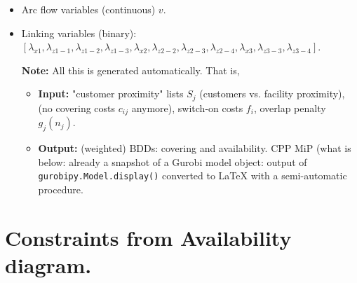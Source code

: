 \documentclass[11pt]{article}
\begin{document}
\begin{itemize}
\item Arc flow variables (continuous) \(v\).
\item Linking variables (binary): \([\lambda_{x1}, \lambda_{z1-1}, \lambda_{z1-2}, \lambda_{z1-3}, \lambda_{x2}, \lambda_{z2-2}, \lambda_{z2-3}, \lambda_{z2-4}, \lambda_{x3}, \lambda_{z3-3}, \lambda_{z3-4}]\).

\textbf{Note:} All this is generated automatically. That is,
\begin{itemize}
\item \textbf{Input:} "customer proximity" lists \(S_j\) (customers vs. facility
proximity), (no covering costs \(c_{ij}\) anymore), switch-on costs \(f_i\), overlap penalty \(g_j(n_j)\).
\item \textbf{Output:} (weighted) BDDs: covering and availability. CPP MiP (what is
below: already a snapshot of a Gurobi model object: output of
\texttt{gurobipy.Model.display()} converted to \LaTeX{} with a semi-automatic
procedure.
\end{itemize}
\end{itemize}

\section{Constraints from Availability diagram.}
\label{sec:org2ccc074}
\end{document}
